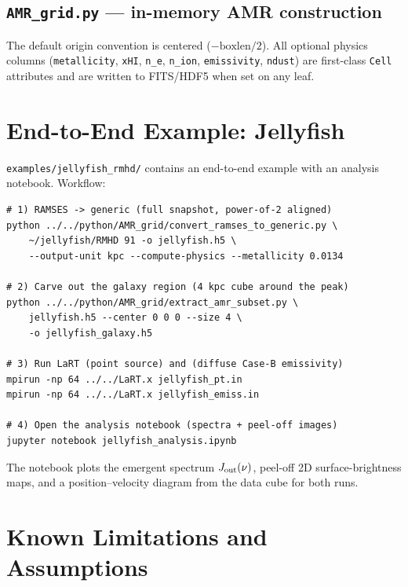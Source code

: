 \documentclass[english,a4paper]{my_memo}
\begin{document}
\subsection{\texttt{AMR\_grid.py} --- in-memory AMR construction}

The default origin convention is centered ($-\text{boxlen}/2$).  All
optional physics columns (\texttt{metallicity}, \texttt{xHI},
\texttt{n\_e}, \texttt{n\_ion}, \texttt{emissivity}, \texttt{ndust})
are first-class \texttt{Cell} attributes and are written to FITS/HDF5
when set on any leaf.

\section{End-to-End Example: Jellyfish}

\texttt{examples/jellyfish\_rmhd/} contains an end-to-end example with
an analysis notebook.  Workflow:

\begin{lstlisting}[style=shellstyle]
# 1) RAMSES -> generic (full snapshot, power-of-2 aligned)
python ../../python/AMR_grid/convert_ramses_to_generic.py \
    ~/jellyfish/RMHD 91 -o jellyfish.h5 \
    --output-unit kpc --compute-physics --metallicity 0.0134

# 2) Carve out the galaxy region (4 kpc cube around the peak)
python ../../python/AMR_grid/extract_amr_subset.py \
    jellyfish.h5 --center 0 0 0 --size 4 \
    -o jellyfish_galaxy.h5

# 3) Run LaRT (point source) and (diffuse Case-B emissivity)
mpirun -np 64 ../../LaRT.x jellyfish_pt.in
mpirun -np 64 ../../LaRT.x jellyfish_emiss.in

# 4) Open the analysis notebook (spectra + peel-off images)
jupyter notebook jellyfish_analysis.ipynb
\end{lstlisting}

The notebook plots the emergent spectrum $J_{\rm out}(\nu)$, peel-off
2D surface-brightness maps, and a position--velocity diagram from the
data cube for both runs.

\section{Known Limitations and Assumptions}
\end{document}
